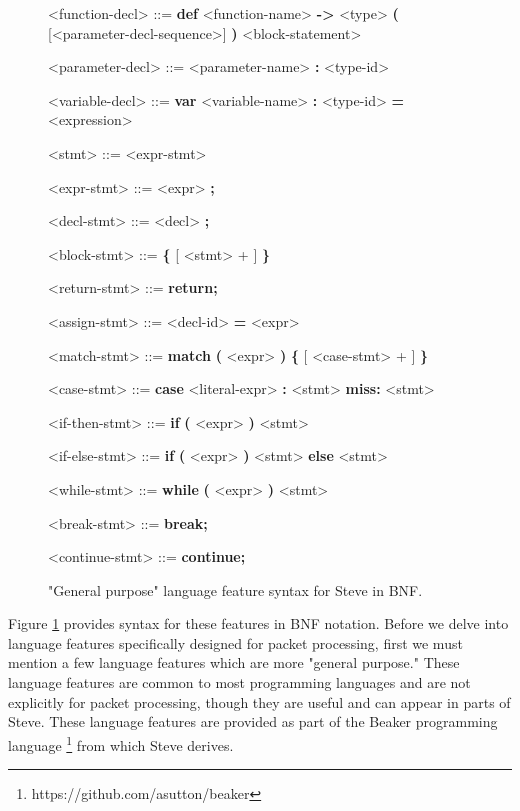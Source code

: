 \begin{figure}
\begin{mdframed}
\begin{grammar}

<function-decl> ::=
\textbf{def} <function-name> \textbf{-\textgreater} <type> 
\textbf{(} [<parameter-decl-sequence>] \textbf{)} <block-statement>

<parameter-decl> ::=
<parameter-name> \textbf{:} <type-id>

<variable-decl> ::=
\textbf{var} <variable-name> \textbf{:} <type-id> \textbf{=} <expression>

<stmt> ::=
<expr-stmt>

<expr-stmt> ::= <expr> \textbf{;}

<decl-stmt> ::= <decl> \textbf{;}

<block-stmt> ::= 
\textbf{\{}
	[ <stmt> + ]
\textbf{\}}

<return-stmt> ::= \textbf{return;}

<assign-stmt> ::= <decl-id> \textbf{=} <expr>

<match-stmt> ::= \textbf{match} \textbf{(} <expr> \textbf{)}
\textbf{\{}
	[ <case-stmt> + ]
\textbf{\}}

<case-stmt> ::=
\textbf{case} <literal-expr> \textbf{:} <stmt>
\alt \textbf{miss:} <stmt>

<if-then-stmt> ::= \textbf{if} \textbf{(} <expr> \textbf{)}
<stmt>

<if-else-stmt> ::= \textbf{if} \textbf{(} <expr> \textbf{)}
<stmt> \textbf{else} <stmt>

<while-stmt> ::= \textbf{while} \textbf{(} <expr> \textbf{)}
<stmt>

<break-stmt> ::= \textbf{break;}

<continue-stmt> ::= \textbf{continue;}

\end{grammar}
\end{mdframed}
\caption{"General purpose" language feature syntax for Steve in BNF.}
\label{fg:general_syntax}
\end{figure}

Figure \ref{fg:general_syntax} provides syntax for these features in BNF notation. Before we delve into language features specifically designed for packet processing, first we must mention a few language features which are more "general purpose." These language features are common to most programming languages and are not explicitly for packet processing, though they are useful and can appear in parts of Steve. These language features are provided as part of the Beaker programming language \footnote{https://github.com/asutton/beaker} from which Steve derives.

